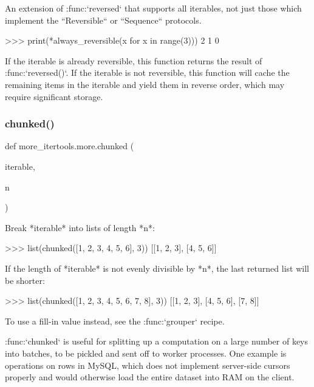 \begin{DoxyVerb}An extension of :func:`reversed` that supports all iterables, not
just those which implement the ``Reversible`` or ``Sequence`` protocols.

    >>> print(*always_reversible(x for x in range(3)))
    2 1 0

If the iterable is already reversible, this function returns the
result of :func:`reversed()`. If the iterable is not reversible,
this function will cache the remaining items in the iterable and
yield them in reverse order, which may require significant storage.
\end{DoxyVerb}
 \mbox{\label{namespacemore__itertools_1_1more_af5f7231fe2247dfc60f3874bca18eacd}} 
\subsubsection{\texorpdfstring{chunked()}{chunked()}}
{\footnotesize\ttfamily def more\+\_\+itertools.\+more.\+chunked (\begin{DoxyParamCaption}\item[{}]{iterable,  }\item[{}]{n }\end{DoxyParamCaption})}

\begin{DoxyVerb}Break *iterable* into lists of length *n*:

    >>> list(chunked([1, 2, 3, 4, 5, 6], 3))
    [[1, 2, 3], [4, 5, 6]]

If the length of *iterable* is not evenly divisible by *n*, the last
returned list will be shorter:

    >>> list(chunked([1, 2, 3, 4, 5, 6, 7, 8], 3))
    [[1, 2, 3], [4, 5, 6], [7, 8]]

To use a fill-in value instead, see the :func:`grouper` recipe.

:func:`chunked` is useful for splitting up a computation on a large number
of keys into batches, to be pickled and sent off to worker processes. One
example is operations on rows in MySQL, which does not implement
server-side cursors properly and would otherwise load the entire dataset
into RAM on the client.\end{DoxyVerb}
 \mbox{\label{namespacemore__itertools_1_1more_a7e66a1597fd81e83fbf34c5c1ef06958}} 
